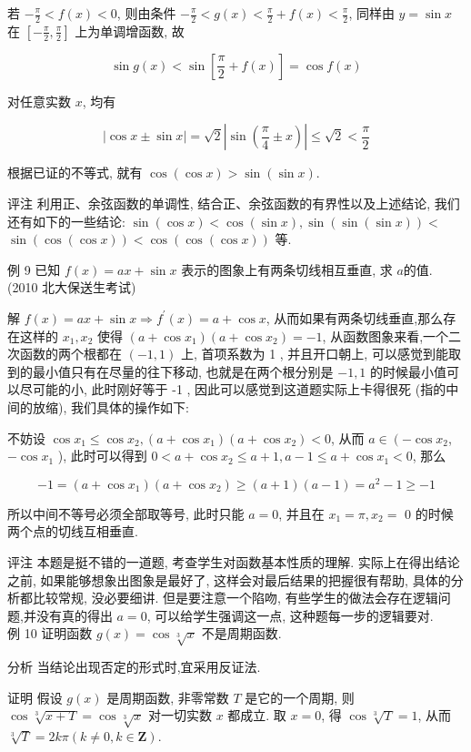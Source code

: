 若 $-\frac{\pi}{2}<f(x)<0$, 则由条件 $-\frac{\pi}{2}<g(x)<\frac{\pi}{2}+f(x)<\frac{\pi}{2}$, 同样由 $y=\sin x$ 在 $\left[-\frac{\pi}{2}, \frac{\pi}{2}\right]$ 上为单调增函数, 故

$$
	\sin g(x)<\sin \left[\frac{\pi}{2}+f(x)\right]=\cos f(x)
$$

对任意实数 $x$, 均有

$$
	|\cos x \pm \sin x|=\sqrt{2}\left|\sin \left(\frac{\pi}{4} \pm x\right)\right| \leqslant \sqrt{2}<\frac{\pi}{2}
$$

根据已证的不等式, 就有 $\cos (\cos x)>\sin (\sin x)$.

评注 利用正、余弦函数的单调性, 结合正、余弦函数的有界性以及上述结论, 我们还有如下的一些结论: $\sin (\cos x)<\cos (\sin x), \sin (\sin (\sin x))<$ $\sin (\cos (\cos x))<\cos (\cos (\cos x))$ 等.

例 9 已知 $f(x)=a x+\sin x$ 表示的图象上有两条切线相互垂直, 求 $a$的值. (2010 北大保送生考试)

解 $f(x)=a x+\sin x \Rightarrow f^{\prime}(x)=a+\cos x$, 从而如果有两条切线垂直,那么存在这样的 $x_{1}, x_{2}$ 使得 $\left(a+\cos x_{1}\right)\left(a+\cos x_{2}\right)=-1$, 从函数图象来看,一个二次函数的两个根都在 $(-1,1)$ 上, 首项系数为 1 , 并且开口朝上, 可以感觉到能取到的最小值只有在尽量的往下移动, 也就是在两个根分别是 $-1,1$ 的时候最小值可以尽可能的小, 此时刚好等于 -1 , 因此可以感觉到这道题实际上卡得很死 (指的中间的放缩), 我们具体的操作如下:

不妨设 $\cos x_{1} \leqslant \cos x_{2},\left(a+\cos x_{1}\right)\left(a+\cos x_{2}\right)<0$, 从而 $a \in\left(-\cos x_{2}\right.$, $-\cos x_{1}$ ), 此时可以得到 $0<a+\cos x_{2} \leqslant a+1, a-1 \leqslant a+\cos x_{1}<0$, 那么

	$$
		-1=\left(a+\cos x_{1}\right)\left(a+\cos x_{2}\right) \geqslant(a+1)(a-1)=a^{2}-1 \geqslant-1
	$$

	所以中间不等号必须全部取等号, 此时只能 $a=0$, 并且在 $x_{1}=\pi, x_{2}=$ 0 的时候两个点的切线互相垂直.

	评注 本题是挺不错的一道题, 考查学生对函数基本性质的理解. 实际上在得出结论之前, 如果能够想象出图象是最好了, 这样会对最后结果的把握很有帮助, 具体的分析都比较常规, 没必要细讲. 但是要注意一个陷吻, 有些学生的做法会存在逻辑问题,并没有真的得出 $a=0$, 可以给学生强调这一点, 这种题每一步的逻辑要对.\\
	例 10 证明函数 $g(x)=\cos \sqrt[3]{x}$ 不是周期函数.

	分析 当结论出现否定的形式时,宜采用反证法.

	证明 假设 $g(x)$ 是周期函数, 非零常数 $T$ 是它的一个周期, 则 $\cos \sqrt[3]{x+T}=\cos \sqrt[3]{x}$ 对一切实数 $x$ 都成立. 取 $x=0$, 得 $\cos \sqrt[3]{T}=1$, 从而 $\sqrt[3]{T}=2 k \pi(k \neq 0, k \in \mathbf{Z})$.


